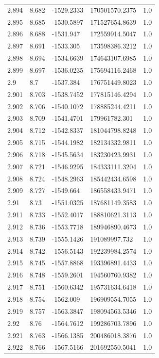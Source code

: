 \begin{tabular}{lllll}
2.894 & 8.682 & -1529.2333 & 170501570.2375 & 1.0 \\
2.895 & 8.685 & -1530.5897 & 171527654.8639 & 1.0 \\
2.896 & 8.688 & -1531.947 & 172559914.5047 & 1.0 \\
2.897 & 8.691 & -1533.305 & 173598386.3212 & 1.0 \\
2.898 & 8.694 & -1534.6639 & 174643107.6985 & 1.0 \\
2.899 & 8.697 & -1536.0235 & 175694116.2468 & 1.0 \\
2.9 & 8.7 & -1537.384 & 176751449.8023 & 1.0 \\
2.901 & 8.703 & -1538.7452 & 177815146.4294 & 1.0 \\
2.902 & 8.706 & -1540.1072 & 178885244.4211 & 1.0 \\
2.903 & 8.709 & -1541.4701 & 179961782.301 & 1.0 \\
2.904 & 8.712 & -1542.8337 & 181044798.8248 & 1.0 \\
2.905 & 8.715 & -1544.1982 & 182134332.9811 & 1.0 \\
2.906 & 8.718 & -1545.5634 & 183230423.9931 & 1.0 \\
2.907 & 8.721 & -1546.9295 & 184333111.3204 & 1.0 \\
2.908 & 8.724 & -1548.2963 & 185442434.6598 & 1.0 \\
2.909 & 8.727 & -1549.664 & 186558433.9471 & 1.0 \\
2.91 & 8.73 & -1551.0325 & 187681149.3583 & 1.0 \\
2.911 & 8.733 & -1552.4017 & 188810621.3113 & 1.0 \\
2.912 & 8.736 & -1553.7718 & 189946890.4673 & 1.0 \\
2.913 & 8.739 & -1555.1426 & 191089997.732 & 1.0 \\
2.914 & 8.742 & -1556.5143 & 192239984.2574 & 1.0 \\
2.915 & 8.745 & -1557.8868 & 193396891.4433 & 1.0 \\
2.916 & 8.748 & -1559.2601 & 194560760.9382 & 1.0 \\
2.917 & 8.751 & -1560.6342 & 195731634.6418 & 1.0 \\
2.918 & 8.754 & -1562.009 & 196909554.7055 & 1.0 \\
2.919 & 8.757 & -1563.3847 & 198094563.5346 & 1.0 \\
2.92 & 8.76 & -1564.7612 & 199286703.7896 & 1.0 \\
2.921 & 8.763 & -1566.1385 & 200486018.3876 & 1.0 \\
2.922 & 8.766 & -1567.5166 & 201692550.5041 & 1.0 \\

\end{tabular}
